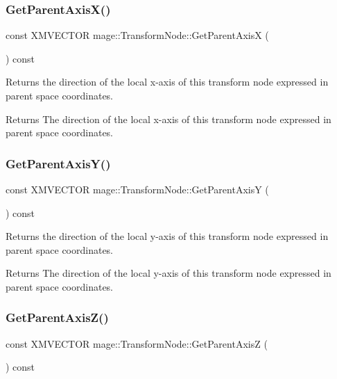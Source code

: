\subsubsection{\texorpdfstring{Get\+Parent\+Axis\+X()}{GetParentAxisX()}}
{\footnotesize\ttfamily const X\+M\+V\+E\+C\+T\+OR mage\+::\+Transform\+Node\+::\+Get\+Parent\+AxisX (\begin{DoxyParamCaption}{ }\end{DoxyParamCaption}) const}

Returns the direction of the local x-\/axis of this transform node expressed in parent space coordinates.

\begin{DoxyReturn}{Returns}
The direction of the local x-\/axis of this transform node expressed in parent space coordinates. 
\end{DoxyReturn}
\hypertarget{classmage_1_1_transform_node_a67b78520c247ac38d853481e76e144c8}{}\label{classmage_1_1_transform_node_a67b78520c247ac38d853481e76e144c8} 
\subsubsection{\texorpdfstring{Get\+Parent\+Axis\+Y()}{GetParentAxisY()}}
{\footnotesize\ttfamily const X\+M\+V\+E\+C\+T\+OR mage\+::\+Transform\+Node\+::\+Get\+Parent\+AxisY (\begin{DoxyParamCaption}{ }\end{DoxyParamCaption}) const}

Returns the direction of the local y-\/axis of this transform node expressed in parent space coordinates.

\begin{DoxyReturn}{Returns}
The direction of the local y-\/axis of this transform node expressed in parent space coordinates. 
\end{DoxyReturn}
\hypertarget{classmage_1_1_transform_node_ae165746ea0907f39429608b06d4c57af}{}\label{classmage_1_1_transform_node_ae165746ea0907f39429608b06d4c57af} 
\subsubsection{\texorpdfstring{Get\+Parent\+Axis\+Z()}{GetParentAxisZ()}}
{\footnotesize\ttfamily const X\+M\+V\+E\+C\+T\+OR mage\+::\+Transform\+Node\+::\+Get\+Parent\+AxisZ (\begin{DoxyParamCaption}{ }\end{DoxyParamCaption}) const}

